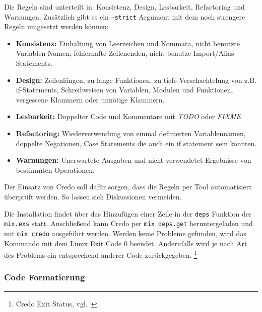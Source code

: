 Die Regeln sind unterteilt in: Konsistenz, Design, Lesbarkeit, Refactoring und Warnungen.
Zusätzlich gibt es ein \texttt{--strict} Argument mit dem noch strengere Regeln umgesetzt werden können:

\begin{itemize}
    \item \textbf{Konsistenz:}
    Einhaltung von Leerzeichen und Kommata, nicht benutzte Variablen Namen, fehlerhafte Zeilenenden, nicht benutze Import/Alias Statements.

    \item \textbf{Design:}
    Zeilenlängen, zu lange Funktionen, zu tiefe Verschachtelung von z.B. if-Statements, Schreibweisen von Variablen, Modulen und Funktionen, vergessene Klammern oder unnötige Klammern.

    \item \textbf{Lesbarkeit:}
    Doppelter Code und Kommentare mit \textsl{TODO} oder \textsl{FIXME}

    \item \textbf{Refactoring:}
    Wiederverwendung von einmal definierten Variablennamen, doppelte Negationen, Case Statements die auch ein if statement sein könnten.

    \item \textbf{Warnungen:}
    Unerwartete Ausgaben und nicht verwendetet Ergebnisse von bestimmten Operationen.

\end{itemize}

Der Einsatz von Credo soll dafür sorgen, dass die Regeln per Tool automatisiert überprüft werden.
So lassen sich Diskussionen vermeiden.

Die Installation findet über das Hinzufügen einer Zeile in der \texttt{deps} Funktion der \texttt{mix.exs} statt.
Anschließend kann Credo per \texttt{mix deps.get} heruntergeladen und mit \texttt{mix credo} ausgeführt werden.
Werden keine Probleme gefunden, wird das Kommando mit dem Linux Exit Code 0 beendet.
Andernfalls wird je nach Art des Problems ein entsprechend anderer Code zurückgegeben.
\footnote{{Credo Exit Status, vgl.~\cite{ELIXIR_CREDO_EXIT_STATUS}}} \\


\subsubsection{Code Formatierung}

